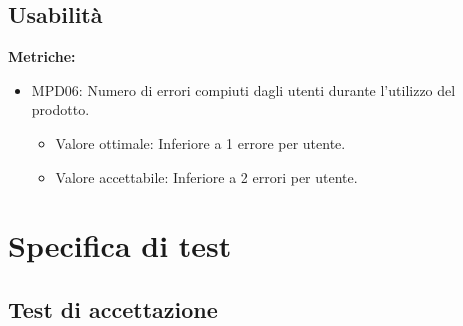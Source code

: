 \documentclass[12pt]{article}
\begin{document}
\subsection{Usabilità}
\textbf{Metriche:}
\begin{itemize}
	\item MPD06: Numero di errori compiuti dagli utenti durante l'utilizzo del prodotto.
	      \begin{itemize}
		      \item Valore ottimale: Inferiore a 1 errore per utente.
		      \item Valore accettabile: Inferiore a 2 errori per utente.
	      \end{itemize}
\end{itemize}


\section{Specifica di test}
\subsection{Test di accettazione}
\end{document}
